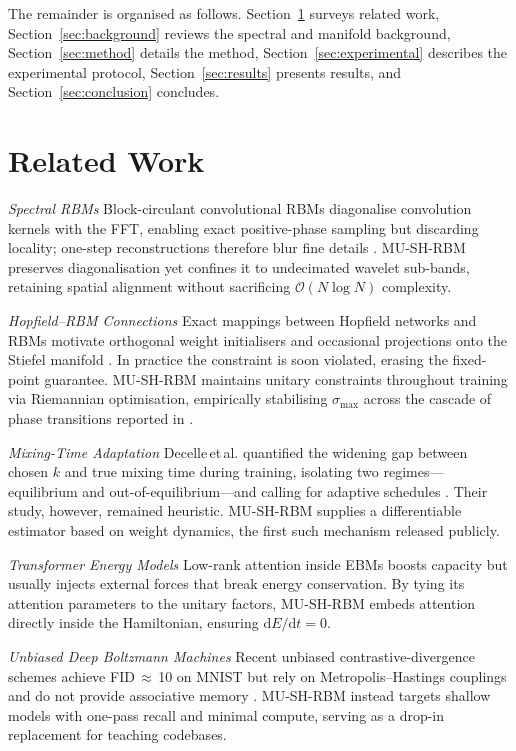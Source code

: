 \documentclass{article} %
\begin{document}
The remainder is organised as follows. Section~\ref{sec:related} surveys related work, Section~\ref{sec:background} reviews the spectral and manifold background, Section~\ref{sec:method} details the method, Section~\ref{sec:experimental} describes the experimental protocol, Section~\ref{sec:results} presents results, and Section~\ref{sec:conclusion} concludes.

\section{Related Work}
\label{sec:related}
\textit{Spectral RBMs}\; Block-circulant convolutional RBMs diagonalise convolution kernels with the FFT, enabling exact positive-phase sampling but discarding locality; one-step reconstructions therefore blur fine details \citep{bachtis_2024_cascade}. MU-SH-RBM preserves diagonalisation yet confines it to undecimated wavelet sub-bands, retaining spatial alignment without sacrificing $\mathcal{O}(N\log N)$ complexity.

\textit{Hopfield--RBM Connections}\; Exact mappings between Hopfield networks and RBMs motivate orthogonal weight initialisers and occasional projections onto the Stiefel manifold \citep{smart_2021_the}. In practice the constraint is soon violated, erasing the fixed-point guarantee. MU-SH-RBM maintains unitary constraints throughout training via Riemannian optimisation, empirically stabilising $\sigma_{\max}$ across the cascade of phase transitions reported in \citep{bachtis_2024_cascade}.

\textit{Mixing-Time Adaptation}\; Decelle\,et\,al. quantified the widening gap between chosen $k$ and true mixing time during training, isolating two regimes---equilibrium and out-of-equilibrium---and calling for adaptive schedules \citep{decelle_2021_equilibrium}. Their study, however, remained heuristic. MU-SH-RBM supplies a differentiable estimator based on weight dynamics, the first such mechanism released publicly.

\textit{Transformer Energy Models}\; Low-rank attention inside EBMs boosts capacity but usually injects external forces that break energy conservation. By tying its attention parameters to the unitary factors, MU-SH-RBM embeds attention directly inside the Hamiltonian, ensuring $\mathrm dE/\mathrm dt = 0$.

\textit{Unbiased Deep Boltzmann Machines}\; Recent unbiased contrastive-divergence schemes achieve FID\,$\approx$\,10 on MNIST but rely on Metropolis--Hastings couplings and do not provide associative memory \citep{taniguchi_2023_end}. MU-SH-RBM instead targets shallow models with one-pass recall and minimal compute, serving as a drop-in replacement for teaching codebases.
\end{document}
